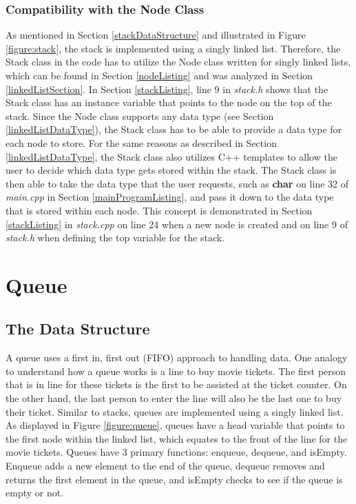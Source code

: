 \documentclass[letterpaper, 10pt,DIV=13]{scrartcl}
\numberwithin{equation}{section} %
\numberwithin{figure}{section} %
\numberwithin{table}{section} %
\begin{document}
\subsubsection{Compatibility with the Node Class}
As mentioned in Section \ref{stackDataStructure} and illustrated in Figure \ref{figure:stack}, the stack is implemented using a singly linked list. Therefore, the Stack
class in the code has to utilize the Node class written for singly linked lists, which can be found in Section \ref{nodeListing} and was analyzed in Section \ref{linkedListSection}.
In Section \ref{stackListing}, line 9 in \textit{stack.h} shows that the Stack class has an instance variable that points to the node on the top of the stack. Since the Node
class supports any data type (see Section \ref{linkedListDataType}), the Stack class has to be able to provide a data type for each node to store. For the same reasons as
described in Section \ref{linkedListDataType}, the Stack class also utilizes C++ templates to allow the user to decide which data type gets stored within the stack.
The Stack class is then able to take the data type that the user requests, such as \textbf{char} on line 32 of \textit{main.cpp} in Section \ref{mainProgramListing},
and pass it down to the data type that is stored within each node. This concept is demonstrated in Section \ref{stackListing} in \textit{stack.cpp} on 
line 24 when a new node is created and on line 9 of \textit{stack.h} when defining the top variable for the stack.

\section{Queue}
\subsection{The Data Structure}
A queue uses a first in, first out (FIFO) approach to handling data. One analogy to understand how a queue works is a line to buy movie tickets. The first person that
is in line for these tickets is the first to be assisted at the ticket counter. On the other hand, the last person to enter the line will also be the last one to
buy their ticket. Similar to stacks, queues are implemented using a singly linked list. As displayed in Figure \ref{figure:queue}, queues have a head variable 
that points to the first node within the linked list, which equates to the front of the line for the movie tickets. Queues have 3 primary functions: enqueue, dequeue,
and isEmpty. Enqueue adds a new element to the end of the queue, dequeue removes and returns the first element in the queue, and isEmpty checks to see if the queue is empty or not.
\end{document}
